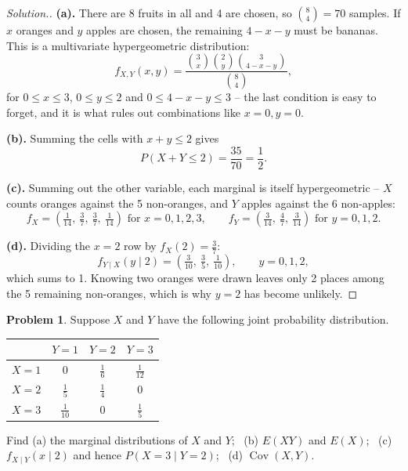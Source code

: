 \documentclass[12pt,a4paper]{report}
\theoremstyle{definition}
\theoremstyle{plain}
\theoremstyle{definition}
\newtheorem{problemx}{Problem}[section]
\newenvironment{problem}{\begin{problemx}}{\end{problemx}}
\newenvironment{solution}
  {\renewcommand{\qedsymbol}{}\begin{proof}[\textit{Solution}.]}
  {\end{proof}}
\begin{document}
\begin{solution}
\textbf{(a).} There are 8 fruits in all and 4 are chosen, so $\binom{8}{4} = 70$ samples.
If $x$ oranges and $y$ apples are chosen, the remaining $4-x-y$ must be bananas. This is a
multivariate hypergeometric distribution:
\[f_{X,Y}(x,y) = \frac{\binom{3}{x}\binom{2}{y}\binom{3}{4-x-y}}{\binom{8}{4}},\]
for $0\leq x\leq 3$, $0\leq y\leq 2$ and $0\leq 4-x-y\leq 3$ -- the last condition is easy
to forget, and it is what rules out combinations like $x=0,y=0$.

\textbf{(b).} Summing the cells with $x+y\leq 2$ gives
\[P(X+Y\leq 2) = \frac{35}{70} = \frac{1}{2}.\]

\textbf{(c).} Summing out the other variable, each marginal is itself hypergeometric --
$X$ counts oranges against the 5 non-oranges, and $Y$ apples against the 6 non-apples:
\[f_X = \left(\tfrac{1}{14},\ \tfrac{3}{7},\ \tfrac{3}{7},\ \tfrac{1}{14}\right)
 \text{ for } x = 0,1,2,3, \qquad
f_Y = \left(\tfrac{3}{14},\ \tfrac{4}{7},\ \tfrac{3}{14}\right) \text{ for } y = 0,1,2.\]

\textbf{(d).} Dividing the $x=2$ row by $f_X(2) = \tfrac37$:
\[f_{Y\mid X}(y\mid 2) = \left(\tfrac{3}{10},\ \tfrac{3}{5},\ \tfrac{1}{10}\right),
\qquad y = 0,1,2,\]
which sums to 1. Knowing two oranges were drawn leaves only 2 places among the 5 remaining
non-oranges, which is why $y=2$ has become unlikely.
\end{solution}

\begin{problem}
Suppose $X$ and $Y$ have the following joint probability distribution.
\begin{table}[H]
\centering
\begin{tabular}{lccc}
 & $Y=1$ & $Y=2$ & $Y=3$\\
\hline
$X=1$ & $0$            & $\frac{1}{6}$ & $\frac{1}{12}$\\
$X=2$ & $\frac{1}{5}$  & $\frac{1}{4}$ & $0$\\
$X=3$ & $\frac{1}{10}$ & $0$           & $\frac{1}{5}$\\
\end{tabular}
\end{table}
Find (a) the marginal distributions of $X$ and $Y$; \, (b) $E(XY)$ and $E(X)$; \,
(c) $f_{X\mid Y}(x\mid 2)$ and hence $P(X=3\mid Y=2)$; \, (d) $\operatorname{Cov}(X,Y)$.
\end{problem}
\end{document}
